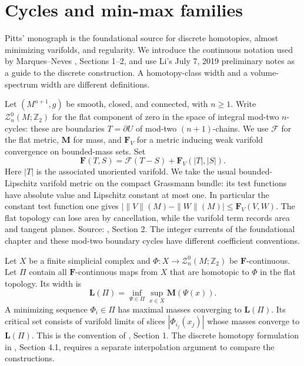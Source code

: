 \chapter{Cycles and min-max families}\label{sec:minmax-cycles}
Pitts' monograph \cite{Pitts81} is the foundational source for discrete homotopies, almost minimizing varifolds, and regularity. We introduce the continuous notation used by Marques--Neves \cite{MNIndex}, Sections 1--2, and use Li's July 7, 2019 preliminary notes \cite{LiAP} as a guide to the discrete construction. A homotopy-class width and a volume-spectrum width are different definitions.

\begin{definition}\label{def:minmax-cycles}
Let $(M^{n+1},g)$ be smooth, closed, and connected, with $n\geq1$. Write $\mathcal Z_n^0(M;\mathbb Z_2)$ for the flat component of zero in the space of integral mod-two $n$-cycles: these are boundaries $T=\partial U$ of mod-two $(n+1)$-chains. We use $\mathcal F$ for the flat metric, $\mathbf M$ for mass, and $\mathbf F_V$ for a metric inducing weak varifold convergence on bounded-mass sets. Set
\[
 \mathbf F(T,S)=\mathcal F(T-S)+\mathbf F_V(|T|,|S|).
\]
Here $|T|$ is the associated unoriented varifold. We take the usual bounded-Lipschitz varifold metric on the compact Grassmann bundle: its test functions have absolute value and Lipschitz constant at most one. In particular the constant test function one gives $|\|V\|(M)-\|W\|(M)|\leq\mathbf F_V(V,W)$. The flat topology can lose area by cancellation, while the varifold term records area and tangent planes. Source: \cite{MNIndex}, Section 2. The integer currents of the foundational chapter and these mod-two boundary cycles have different coefficient conventions.
\end{definition}

\begin{definition}\label{def:homotopy-width}
Let $X$ be a finite simplicial complex and $\Phi:X\to\mathcal Z_n^0(M;\mathbb Z_2)$ be $\mathbf F$-continuous. Let $\Pi$ contain all $\mathbf F$-continuous maps from $X$ that are homotopic to $\Phi$ in the flat topology. Its width is
\[
 \mathbf L(\Pi)=\inf_{\Psi\in\Pi}\sup_{x\in X}\mathbf M(\Psi(x)).
\]
A minimizing sequence $\Phi_i\in\Pi$ has maximal masses converging to $\mathbf L(\Pi)$. Its critical set consists of varifold limits of slices $|\Phi_{i_j}(x_j)|$ whose masses converge to $\mathbf L(\Pi)$. This is the convention of \cite{MNIndex}, Section 1. The discrete homotopy formulation in \cite{Pitts81}, Section 4.1, requires a separate interpolation argument to compare the constructions.
\end{definition}

